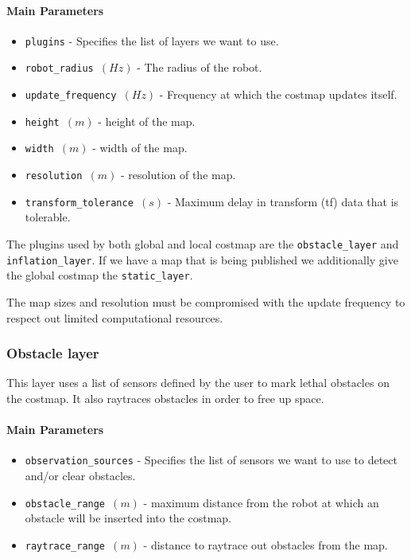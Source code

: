 \documentclass[12pt]{article}
\begin{document}
\paragraph{Main Parameters \cite{costmap}}
\begin{itemize}[label={}]
    \item \texttt{plugins} - Specifies the list of layers we want to use.
    \item \texttt{robot\_radius $(Hz)$} - The radius of the robot.
    \item \texttt{update\_frequency $(Hz)$} - Frequency at which the costmap updates itself.
    \item \texttt{height $(m)$} - height of the map.
    \item \texttt{width $(m)$} - width  of the map.
    \item \texttt{resolution $(m)$} - resolution  of the map.
    \item \texttt{transform\_tolerance $(s)$} - Maximum delay in transform (tf) data that is tolerable.
\end{itemize}

The plugins used by both global and local costmap are the \texttt{obstacle\_layer} and \texttt{inflation\_layer}. If we have a map that is being published we additionally  give the global costmap the  \texttt{static\_layer}.

The map sizes and resolution must be compromised with the update frequency to respect out limited computational resources.

\subsubsection{Obstacle layer}
This layer uses a list of sensors defined by the user to mark lethal obstacles on the costmap. It also raytraces obstacles in order to free up space.
\paragraph{Main Parameters \cite{obstacle}}

\begin{itemize}[label={}]
    \item \texttt{observation\_sources} - Specifies the list of sensors we want to use to detect and/or clear obstacles.
    \item \texttt{obstacle\_range $(m)$} - maximum distance from the robot at which an obstacle will be inserted into the costmap.
    \item \texttt{raytrace\_range $(m)$} - distance to raytrace out obstacles from the map.
\end{itemize}
\end{document}
